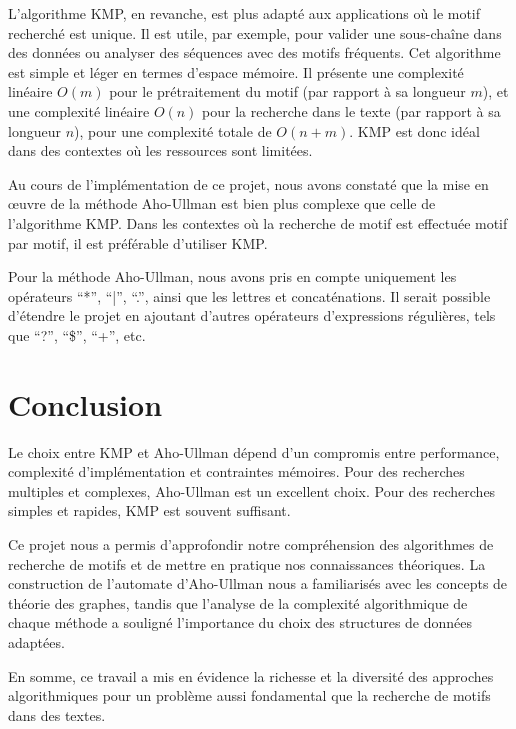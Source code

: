 \documentclass{article}
\begin{document}
L’algorithme KMP, en revanche, est plus adapté aux applications où le motif recherché est unique. Il est utile, par exemple, pour valider une sous-chaîne dans des données ou analyser des séquences avec des motifs fréquents. Cet algorithme est simple et léger en termes d’espace mémoire. Il présente une complexité linéaire \( O(m) \) pour le prétraitement du motif (par rapport à sa longueur \( m \)), et une complexité linéaire \( O(n) \) pour la recherche dans le texte (par rapport à sa longueur \( n \)), pour une complexité totale de \( O(n + m) \). KMP est donc idéal dans des contextes où les ressources sont limitées.

Au cours de l'implémentation de ce projet, nous avons constaté que la mise en œuvre de la méthode Aho-Ullman est bien plus complexe que celle de l’algorithme KMP. Dans les contextes où la recherche de motif est effectuée motif par motif, il est préférable d’utiliser KMP.

Pour la méthode Aho-Ullman, nous avons pris en compte uniquement les opérateurs ``*'', ``|'', ``.'', ainsi que les lettres et concaténations. Il serait possible d’étendre le projet en ajoutant d'autres opérateurs d'expressions régulières, tels que ``?'', ``\$'', ``+'', etc.

\newpage
\section{Conclusion}
Le choix entre KMP et Aho-Ullman dépend d'un compromis entre performance, complexité d'implémentation et contraintes mémoires. Pour des recherches multiples et complexes, Aho-Ullman est un excellent choix. Pour des recherches simples et rapides, KMP est souvent suffisant.

Ce projet nous a permis d'approfondir notre compréhension des algorithmes de recherche de motifs et de mettre en pratique nos connaissances théoriques. La construction de l'automate d'Aho-Ullman nous a familiarisés avec les concepts de théorie des graphes, tandis que l'analyse de la complexité algorithmique de chaque méthode a souligné l'importance du choix des structures de données adaptées.

En somme, ce travail a mis en évidence la richesse et la diversité des approches algorithmiques pour un problème aussi fondamental que la recherche de motifs dans des textes.

\newpage


\end{document}
